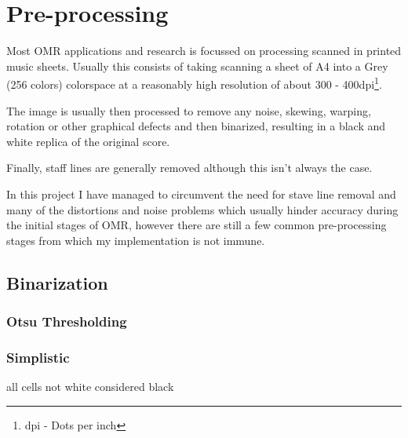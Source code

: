 \section{Pre-processing}

Most OMR applications and research is focussed on processing scanned in printed music sheets. Usually this consists of taking scanning a sheet of A4 into a Grey (256 colors) colorspace at a reasonably high resolution of about 300 - 400dpi\footnote{dpi - Dots per inch}.

The image is usually then processed to remove any noise, skewing, warping, rotation or other graphical defects and then binarized, resulting in a black and white replica of the original score.

Finally, staff lines are generally removed  although this isn't always the case.

In this project I have managed to circumvent the need for stave line removal and many of the distortions and noise problems which usually hinder accuracy during the initial stages of OMR, however  there are still a few common pre-processing stages from which my implementation is not immune.

\subsection{Binarization}
\label{sec:binarization}

\subsubsection{Otsu Thresholding}

\subsubsection{Simplistic}

all cells not white considered black
